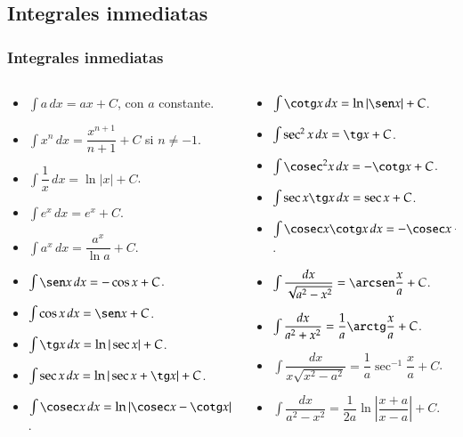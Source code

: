 \subsection{Integrales inmediatas}
\begin{frame}
\frametitle{Integrales inmediatas}
\begin{columns}
\begin{column}{0.5\textwidth}
\begin{itemize}
\item $\int a\,dx=ax+C$, con $a$ constante.
\item $\int x^n\,dx=\dfrac{x^{n+1}}{n+1}+C$ \quad si $n\neq -1$.
\item $\int \dfrac{1}{x}\, dx=\ln|x|+C$.
\item $\int e^x\,dx=e^x+C$.
\item $\int a^x\,dx=\dfrac{a^x}{\ln a}+C$.
\item $\int \sen x\, dx=-\cos x+C$.
\item $\int \cos x\, dx=\sen x+C$.
\item $\int \tg x\, dx=\ln|\sec x|+C$.
\item $\int \sec x\, dx = \ln|\sec x + \tg x|+C$.
\item $\int \cosec x\, dx= \ln|\cosec x-\cotg x|+C$.
\end{itemize}
\end{column}
\begin{column}{0.5\textwidth}
\begin{itemize}
\item $\int \cotg x \, dx= \ln|\sen x|+C$.
\item $\int \sec^2 x\, dx= \tg x+ C$.
\item $\int \cosec^2 x\, dx= -\cotg x+ C$.
\item $\int \sec x \tg x\, dx= \sec x+ C$.
\item $\int \cosec x \cotg x\, dx = -\cosec x +C$.
\item $\int \dfrac{dx}{\sqrt{a^2-x^2}}=\arcsen\dfrac{x}{a}+C$.
\item $\int \dfrac{dx}{a^2+x^2}=\dfrac{1}{a}\arctg\dfrac{x}{a}+C$.
\item $\int \dfrac{dx}{x\sqrt{x^2-a^2}}=\dfrac{1}{a}\sec^{-1}\dfrac{x}{a}+C$.
\item $\int \dfrac{dx}{a^2-x^2}=\dfrac{1}{2a}\ln|\dfrac{x+a}{x-a}|+C$.
\end{itemize}
\end{column}
\end{columns}
\end{frame}


